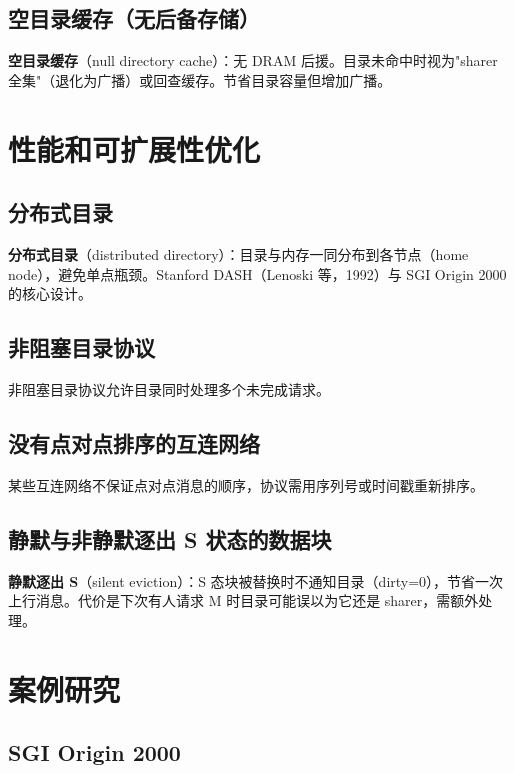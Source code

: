 \subsection{空目录缓存（无后备存储）}

\textbf{空目录缓存}（null directory cache）：无 DRAM 后援。目录未命中时视为"sharer 全集"（退化为广播）或回查缓存。节省目录容量但增加广播。

\section{性能和可扩展性优化}

\subsection{分布式目录}

\textbf{分布式目录}（distributed directory）：目录与内存一同分布到各节点（home node），避免单点瓶颈。Stanford DASH（Lenoski 等，1992）与 SGI Origin 2000 的核心设计。

\subsection{非阻塞目录协议}

非阻塞目录协议允许目录同时处理多个未完成请求。

\subsection{没有点对点排序的互连网络}

某些互连网络不保证点对点消息的顺序，协议需用序列号或时间戳重新排序。

\subsection{静默与非静默逐出 S 状态的数据块}

\textbf{静默逐出 S}（silent eviction）：S 态块被替换时不通知目录（dirty=0），节省一次上行消息。代价是下次有人请求 M 时目录可能误以为它还是 sharer，需额外处理。

\section{案例研究}

\subsection{SGI Origin 2000}

